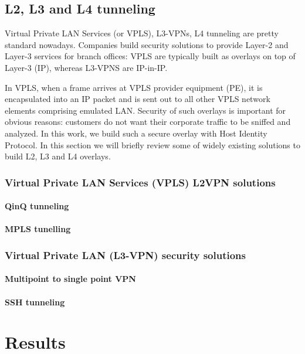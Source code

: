 \section{L2, L3 and L4 tunneling}

Virtual Private LAN Services (or VPLS), L3-VPNs, L4 tunneling are pretty standard nowadays. 
Companies build security solutions to provide Layer-2 and Layer-3 services for branch offices: 
VPLS are typically built as overlays on top of Layer-3 (IP), whereas L3-VPNS are IP-in-IP. 

In VPLS, when a frame arrives at VPLS provider equipment (PE), it is encapsulated 
into an IP packet and is sent out to all other VPLS network elements comprising emulated LAN. 
Security of such overlays is important for obvious reasons: customers do not want their corporate 
traffic to be sniffed and analyzed. In this work, we build such a secure overlay with Host Identity 
Protocol. In this section we will briefly review some of widely existing solutions to build L2, L3 and L4
overlays.

\subsection{Virtual Private LAN Services (VPLS) L2VPN solutions}

\subsubsection{QinQ tunneling}

\subsubsection{MPLS tunelling}

\subsection{Virtual Private LAN (L3-VPN) security solutions}

\subsubsection{Multipoint to single point VPN}

\subsubsection{SSH tunneling}

\chapter{Results}

